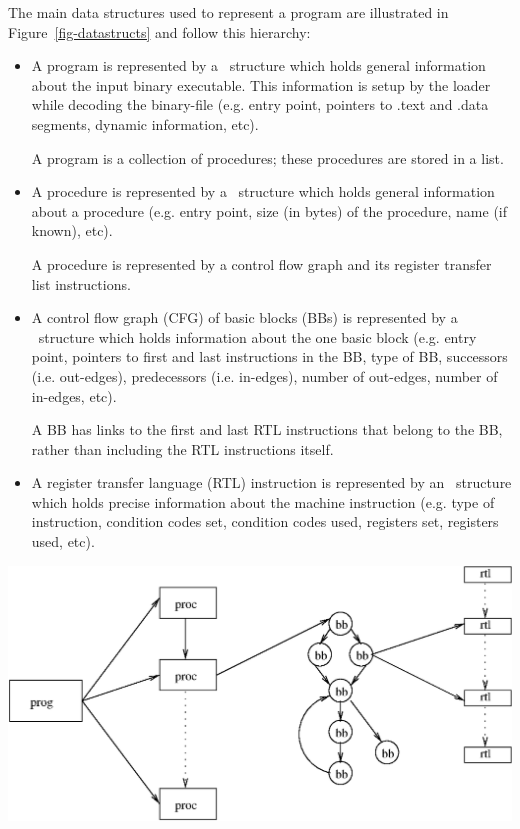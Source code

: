 The main data structures used to represent a program are illustrated
in Figure~\ref{fig-datastructs} and follow this hierarchy:
\begin{itemize}
\item A program is represented by a \prog\ structure which holds
general information about the input binary executable.
This information is setup by the loader while decoding the
binary-file (e.g. entry point, pointers to .text and .data segments,
dynamic information, etc).

A program is a collection of procedures; these procedures are
stored in a list.

\item A procedure is represented by a \proc\ structure which holds
general information about a procedure (e.g. entry point, size (in bytes)
of the procedure, name (if known), etc).

A procedure is represented by a control flow graph and its register
transfer list instructions.

\item A control flow graph (CFG) of basic blocks (BBs) is represented by
a \bb\ structure which holds information about the one basic
block (e.g. entry point, pointers to first and last instructions
in the BB, type of BB, successors (i.e. out-edges), predecessors (i.e.
in-edges), number of out-edges, number of in-edges, etc).

A BB has links to the first and last RTL instructions that belong to
the BB, rather than including the RTL instructions itself.

\item A register transfer language (RTL) instruction is represented
by an \rtl\ structure which holds precise information about the
machine instruction (e.g. type of instruction, condition codes set,
condition codes used, registers set, registers used, etc).
\end{itemize}

\centerfigbegin
\resizebox{!}{6cm}
{\includegraphics{figures/datastructs.eps}}

